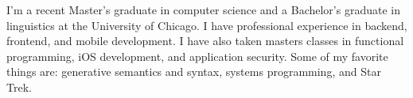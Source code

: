 \documentclass[9pt]{developercv} %
\begin{document}
\vspace{0.5cm}



\begin{minipage}[t]{0.4\textwidth} %
	\vspace{-\baselineskip} %
	
	I'm a recent Master's graduate in computer science and a Bachelor's graduate in linguistics at the University of Chicago. I have professional experience in backend, frontend, and mobile development. I have also taken masters classes in functional programming, iOS development, and application security. Some of my favorite things are: generative semantics and syntax, systems programming, and Star Trek.%
\end{minipage}
\hfill %
\begin{minipage}[t]{0.5\textwidth} %
	\vspace{-\baselineskip} %
	\begin{barchart}{5.5}
	\end{barchart}
\end{minipage}

\begin{center}
\end{center}


\end{document}
